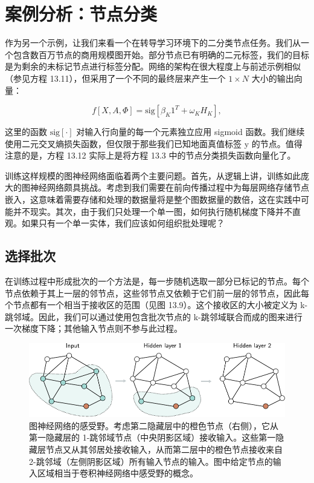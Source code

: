 \documentclass[lang=cn,newtx,10pt,scheme=chinese]{elegantbook}
\begin{document}
\section{案例分析：节点分类}
作为另一个示例，让我们来看一个在转导学习环境下的二分类节点任务。我们从一个包含数百万节点的商用规模图开始。部分节点已有明确的二元标签，我们的目标是为剩余的未标记节点进行标签分配。网络的架构在很大程度上与前述示例相似（参见方程 13.11），但采用了一个不同的最终层来产生一个 \(1 \times N\) 大小的输出向量：

\begin{equation}
f[X, A, \Phi] = \text{sig} [\beta_K 1^T + \omega_K H_K ], 
\end{equation}

这里的函数 \(\text{sig}[\cdot]\) 对输入行向量的每一个元素独立应用 sigmoid 函数。我们继续使用二元交叉熵损失函数，但仅限于那些我们已知地面真值标签 y 的节点。值得注意的是，方程 13.12 实际上是将方程 13.3 中的节点分类损失函数向量化了。

训练这样规模的图神经网络面临着两个主要问题。首先，从逻辑上讲，训练如此庞大的图神经网络颇具挑战。考虑到我们需要在前向传播过程中为每层网络存储节点嵌入，这意味着需要存储和处理的数据量将是整个图数据量的数倍，这在实践中可能并不现实。其次，由于我们只处理一个单一图，如何执行随机梯度下降并不直观。如果只有一个单一实体，我们应该如何组织批处理呢？
\subsection{选择批次}
在训练过程中形成批次的一个方法是，每一步随机选取一部分已标记的节点。每个节点依赖于其上一层的邻节点，这些邻节点又依赖于它们前一层的邻节点，因此每个节点都有一个相当于接收区的范围（见图 13.9）。这个接收区的大小被定义为 k-跳邻域。因此，我们可以通过使用包含批次节点的 k-跳邻域联合而成的图来进行一次梯度下降；其他输入节点则不参与此过程。

\begin{figure}[ht!]
\centering
\includegraphics[width=0.7\linewidth]{PDFFigures/UDLChap13PDF/GraphReceptiveField.pdf}
\caption{图神经网络的感受野。考虑第二隐藏层中的橙色节点（右侧），它从第一隐藏层的 1-跳邻域节点（中央阴影区域）接收输入。这些第一隐藏层节点又从其邻居处接收输入，从而第二层中的橙色节点接收来自 2-跳邻域（左侧阴影区域）所有输入节点的输入。图中给定节点的输入区域相当于卷积神经网络中感受野的概念。}
\end{figure}
\end{document}
